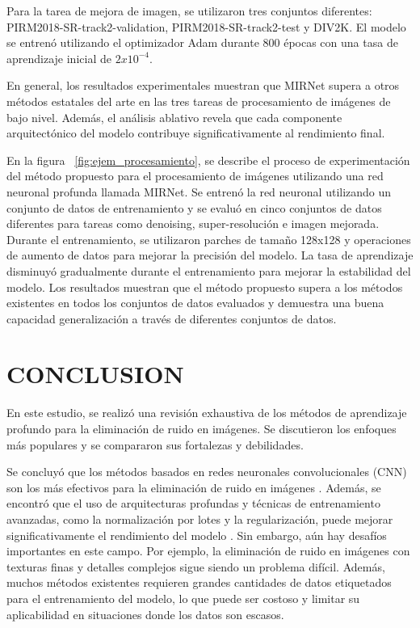 \documentclass[a4paper,
               ]{jacow}
\begin{document}
Para la tarea de mejora de imagen, se utilizaron tres conjuntos diferentes: PIRM2018-SR-track2-validation, PIRM2018-SR-track2-test y DIV2K. El modelo se entrenó utilizando el optimizador Adam durante 800 épocas con una tasa de aprendizaje inicial de $2x10^{-4}$.

En general, los resultados experimentales muestran que MIRNet supera a otros métodos estatales del arte en las tres tareas de procesamiento de imágenes de bajo nivel. Además, el análisis ablativo revela que cada componente arquitectónico del modelo contribuye significativamente al rendimiento final.

En la figura ~\ref{fig:ejem_procesamiento}, se describe el proceso de experimentación del método propuesto para el procesamiento de imágenes utilizando una red neuronal profunda llamada MIRNet. Se entrenó la red neuronal utilizando un conjunto de datos de entrenamiento y se evaluó en cinco conjuntos de datos diferentes para tareas como denoising, super-resolución e imagen mejorada. Durante el entrenamiento, se utilizaron parches de tamaño 128x128 y operaciones de aumento de datos para mejorar la precisión del modelo. La tasa de aprendizaje disminuyó gradualmente durante el entrenamiento para mejorar la estabilidad del modelo. Los resultados muestran que el método propuesto supera a los métodos existentes en todos los conjuntos de datos evaluados y demuestra una buena capacidad generalización a través de diferentes conjuntos de datos.

\section{CONCLUSION}

En este estudio, se realizó una revisión exhaustiva de los métodos de aprendizaje profundo para la eliminación de ruido en imágenes. Se discutieron los enfoques más populares y se compararon sus fortalezas y debilidades.

Se concluyó que los métodos basados en redes neuronales convolucionales (CNN) son los más efectivos para la eliminación de ruido en imágenes \cite{zhang2017beyond, lehtinen2018noise2noise, tai2017image}. Además, se encontró que el uso de arquitecturas profundas y técnicas de entrenamiento avanzadas, como la normalización por lotes y la regularización, puede mejorar significativamente el rendimiento del modelo \cite{lefkimmiatis2018universal}. Sin embargo, aún hay desafíos importantes en este campo. Por ejemplo, la eliminación de ruido en imágenes con texturas finas y detalles complejos sigue siendo un problema difícil. Además, muchos métodos existentes requieren grandes cantidades de datos etiquetados para el entrenamiento del modelo, lo que puede ser costoso y limitar su aplicabilidad en situaciones donde los datos son escasos.
\end{document}
